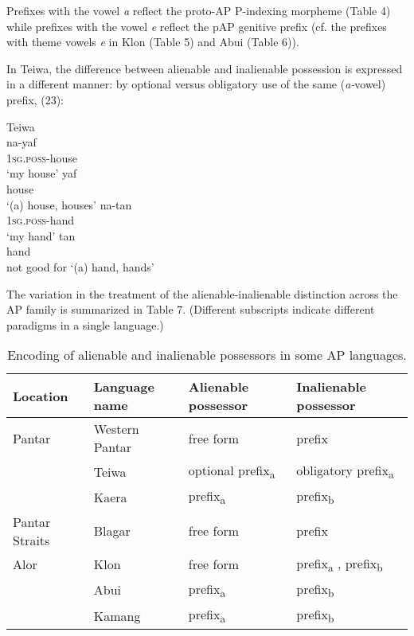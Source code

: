 Prefixes with the vowel \textit{a} reflect the proto-AP P-indexing morpheme (Table 4) while prefixes with the vowel \textit{e} reflect the pAP genitive prefix (cf. the prefixes with theme vowels \textit{e} in Klon (Table 5) and Abui (Table 6)).

In Teiwa, the difference between alienable and inalienable possession is expressed in a different manner: by optional versus obligatory use of the same (\textit{a-}vowel) prefix, (23):



\ea%
\label{ex:23}
Teiwa \citep[192]{Klamer2010a}    \\
\ea
\gll na-yaf \\
  \textsc{1sg.poss-}house  \\
\glt `my house'
\ex
\gll yaf \\
  house   \\
\glt    `(a) house, houses'
\ex
\gll na-tan \\
  \textsc{1sg.poss-}hand   \\
\glt `my hand'
\ex
\gll tan \\
  hand \\
\glt  not good for `(a) hand, hands'
\z\z




The variation in the treatment of the alienable-inalienable distinction across the AP family is summarized in Table 7. (Different subscripts indicate different paradigms in a single language.)



\begin{table}\centering
\begin{tabular}{p{1.4cm}lll}
Location & Language name & Alienable possessor & Inalienable possessor\\
\hline
Pantar & Western Pantar & free form & prefix \\
& Teiwa & optional prefix\textsubscript{a} & obligatory prefix\textsubscript{a} \\
& Kaera & prefix\textsubscript{a} & prefix\textsubscript{b}\\
Pantar Straits & Blagar & free form & prefix\\
Alor & Klon & free form & prefix\textsubscript{a} , prefix\textsubscript{b} \\
& Abui & prefix\textsubscript{a} & prefix\textsubscript{b}\\
& Kamang & prefix\textsubscript{a} & prefix\textsubscript{b}\\
\end{tabular}
\caption{Encoding of alienable and inalienable possessors in some AP languages.}
\end{table}

